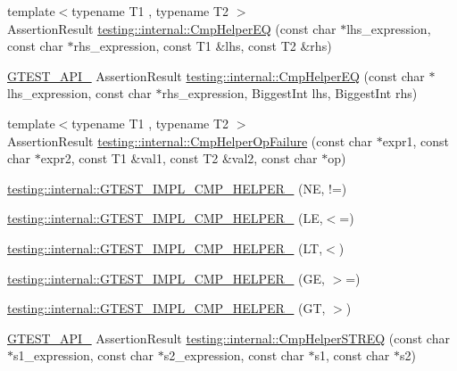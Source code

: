 \begin{DoxyCompactItemize}
\item 
{\footnotesize template$<$typename T1 , typename T2 $>$ }\\Assertion\+Result \mbox{\hyperlink{namespacetesting_1_1internal_a4638c74d9b32e971f9b321af6fafc2f1}{testing\+::internal\+::\+Cmp\+Helper\+EQ}} (const char $\ast$lhs\+\_\+expression, const char $\ast$rhs\+\_\+expression, const T1 \&lhs, const T2 \&rhs)
\item 
\mbox{\hyperlink{_obj__test_2lib_2googletest-release-1_88_81_2googletest_2include_2gtest_2internal_2gtest-port_8h_aa73be6f0ba4a7456180a94904ce17790}{G\+T\+E\+S\+T\+\_\+\+A\+P\+I\+\_\+}} Assertion\+Result \mbox{\hyperlink{namespacetesting_1_1internal_a46582d95cbfe3d3d8f6945c9e9cd779c}{testing\+::internal\+::\+Cmp\+Helper\+EQ}} (const char $\ast$lhs\+\_\+expression, const char $\ast$rhs\+\_\+expression, Biggest\+Int lhs, Biggest\+Int rhs)
\item 
{\footnotesize template$<$typename T1 , typename T2 $>$ }\\Assertion\+Result \mbox{\hyperlink{namespacetesting_1_1internal_a894ffccd936d78fd555f490020c27f0a}{testing\+::internal\+::\+Cmp\+Helper\+Op\+Failure}} (const char $\ast$expr1, const char $\ast$expr2, const T1 \&val1, const T2 \&val2, const char $\ast$op)
\item 
\mbox{\hyperlink{namespacetesting_1_1internal_aa14e3caa94126d7fb8e06bfb3d24ae4a}{testing\+::internal\+::\+G\+T\+E\+S\+T\+\_\+\+I\+M\+P\+L\+\_\+\+C\+M\+P\+\_\+\+H\+E\+L\+P\+E\+R\+\_\+}} (NE, !=)
\item 
\mbox{\hyperlink{namespacetesting_1_1internal_ade60646b18728043fff84d7b4125de2c}{testing\+::internal\+::\+G\+T\+E\+S\+T\+\_\+\+I\+M\+P\+L\+\_\+\+C\+M\+P\+\_\+\+H\+E\+L\+P\+E\+R\+\_\+}} (LE,$<$=)
\item 
\mbox{\hyperlink{namespacetesting_1_1internal_aabcbff15eac496f8487699d19f42c274}{testing\+::internal\+::\+G\+T\+E\+S\+T\+\_\+\+I\+M\+P\+L\+\_\+\+C\+M\+P\+\_\+\+H\+E\+L\+P\+E\+R\+\_\+}} (LT,$<$)
\item 
\mbox{\hyperlink{namespacetesting_1_1internal_af969886067930ce70f6405cd5aa8b06b}{testing\+::internal\+::\+G\+T\+E\+S\+T\+\_\+\+I\+M\+P\+L\+\_\+\+C\+M\+P\+\_\+\+H\+E\+L\+P\+E\+R\+\_\+}} (GE, $>$=)
\item 
\mbox{\hyperlink{namespacetesting_1_1internal_a7fdb4fc164db83c51dfad17640bfeae9}{testing\+::internal\+::\+G\+T\+E\+S\+T\+\_\+\+I\+M\+P\+L\+\_\+\+C\+M\+P\+\_\+\+H\+E\+L\+P\+E\+R\+\_\+}} (GT, $>$)
\item 
\mbox{\hyperlink{_obj__test_2lib_2googletest-release-1_88_81_2googletest_2include_2gtest_2internal_2gtest-port_8h_aa73be6f0ba4a7456180a94904ce17790}{G\+T\+E\+S\+T\+\_\+\+A\+P\+I\+\_\+}} Assertion\+Result \mbox{\hyperlink{namespacetesting_1_1internal_a711a396ed8f636ecd14a850a89d181b6}{testing\+::internal\+::\+Cmp\+Helper\+S\+T\+R\+EQ}} (const char $\ast$s1\+\_\+expression, const char $\ast$s2\+\_\+expression, const char $\ast$s1, const char $\ast$s2)

\end{DoxyCompactItemize}
